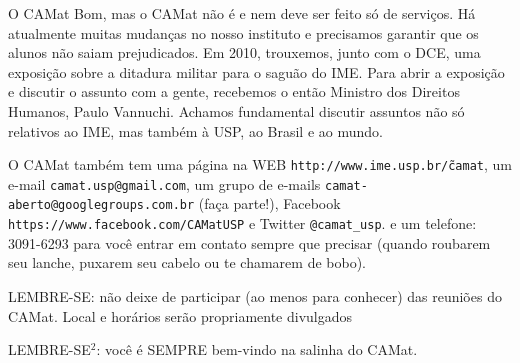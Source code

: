 \begin{secao}{O CAMat}
Bom, mas o CAMat não é e nem deve ser feito só de serviços. Há atualmente
muitas mudanças no nosso instituto e precisamos garantir que os alunos não
saiam prejudicados. Em 2010, trouxemos, junto com o
DCE, uma exposição sobre a ditadura militar para o saguão do IME. Para abrir a
exposição e discutir o assunto com a gente, recebemos o então Ministro dos
Direitos Humanos, Paulo Vannuchi. Achamos fundamental discutir assuntos não só
relativos ao IME, mas também à USP, ao Brasil e ao mundo.


O CAMat também tem uma página na WEB {\tt http://www.ime.usp.br/\~camat}, um
e-mail {\tt camat.usp@gmail.com}, um grupo de e-mails {\tt camat-aberto@googlegroups.com.br} (faça parte!), Facebook {\tt https://www.facebook.com/CAMatUSP} e Twitter {\tt @camat\_usp}.
e um telefone: 3091-6293 para você entrar em contato sempre
que precisar (quando roubarem seu lanche, puxarem seu cabelo ou te chamarem de
bobo).

LEMBRE-SE: não deixe de participar (ao menos para conhecer) das reuniões do
CAMat. Local e horários serão propriamente divulgados

LEMBRE-SE$^2$: você é SEMPRE bem-vindo na salinha do CAMat.

\end{secao}
